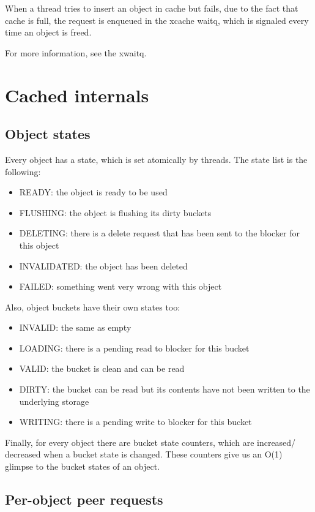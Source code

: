 When a thread tries to insert an object in cache but fails, due to the fact
that cache is full, the request is enqueued in the xcache waitq, which is
signaled every time an object is freed.

For more information, see the xwaitq.

\section{Cached internals}

\subsection{Object states}

Every object has a state, which is set atomically by threads. The state list is
the following:

\begin{itemize}
	\item READY: the object is ready to be used
	\item FLUSHING: the object is flushing its dirty buckets
	\item DELETING: there is a delete request that has been sent to the 
		blocker for this object
	\item INVALIDATED: the object has been deleted
	\item FAILED: something went very wrong with this object
\end{itemize}

Also, object buckets have their own states too:

\begin{itemize}
	\item INVALID: the same as empty
	\item LOADING: there is a pending read to blocker for this bucket
	\item VALID: the bucket is clean and can be read
	\item DIRTY: the bucket can be read but its contents have not been
		written to the underlying storage
	\item WRITING: there is a pending write to blocker for this bucket
\end{itemize}

Finally, for every object there are bucket state counters, which are increased/
decreased when a bucket state is changed. These counters give us an O(1)
glimpse to the bucket states of an object.

\subsection{Per-object peer requests}

